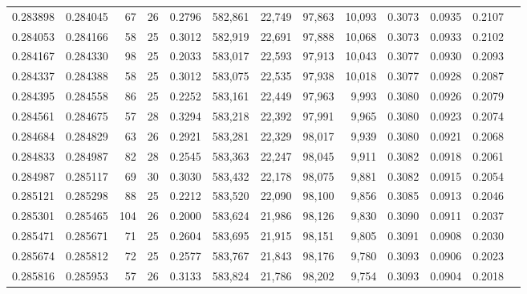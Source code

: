 \begin{tabular}{rrrrrrrrrrrrr}
0.283898 & 0.284045 &  67 &  26 &                                     0.2796 & 582,861 &  22,749 &  97,863 &  10,093 & 0.3073 & 0.0935 & 0.2107 \\
0.284053 & 0.284166 &  58 &  25 &                                     0.3012 & 582,919 &  22,691 &  97,888 &  10,068 & 0.3073 & 0.0933 & 0.2102 \\
0.284167 & 0.284330 &  98 &  25 &                                     0.2033 & 583,017 &  22,593 &  97,913 &  10,043 & 0.3077 & 0.0930 & 0.2093 \\
0.284337 & 0.284388 &  58 &  25 &                                     0.3012 & 583,075 &  22,535 &  97,938 &  10,018 & 0.3077 & 0.0928 & 0.2087 \\
0.284395 & 0.284558 &  86 &  25 &                                     0.2252 & 583,161 &  22,449 &  97,963 &   9,993 & 0.3080 & 0.0926 & 0.2079 \\
0.284561 & 0.284675 &  57 &  28 &                                     0.3294 & 583,218 &  22,392 &  97,991 &   9,965 & 0.3080 & 0.0923 & 0.2074 \\
0.284684 & 0.284829 &  63 &  26 &                                     0.2921 & 583,281 &  22,329 &  98,017 &   9,939 & 0.3080 & 0.0921 & 0.2068 \\
0.284833 & 0.284987 &  82 &  28 &                                     0.2545 & 583,363 &  22,247 &  98,045 &   9,911 & 0.3082 & 0.0918 & 0.2061 \\
0.284987 & 0.285117 &  69 &  30 &                                     0.3030 & 583,432 &  22,178 &  98,075 &   9,881 & 0.3082 & 0.0915 & 0.2054 \\
0.285121 & 0.285298 &  88 &  25 &                                     0.2212 & 583,520 &  22,090 &  98,100 &   9,856 & 0.3085 & 0.0913 & 0.2046 \\
0.285301 & 0.285465 & 104 &  26 &                                     0.2000 & 583,624 &  21,986 &  98,126 &   9,830 & 0.3090 & 0.0911 & 0.2037 \\
0.285471 & 0.285671 &  71 &  25 &                                     0.2604 & 583,695 &  21,915 &  98,151 &   9,805 & 0.3091 & 0.0908 & 0.2030 \\
0.285674 & 0.285812 &  72 &  25 &                                     0.2577 & 583,767 &  21,843 &  98,176 &   9,780 & 0.3093 & 0.0906 & 0.2023 \\
0.285816 & 0.285953 &  57 &  26 &                                     0.3133 & 583,824 &  21,786 &  98,202 &   9,754 & 0.3093 & 0.0904 & 0.2018 \\

\end{tabular}
